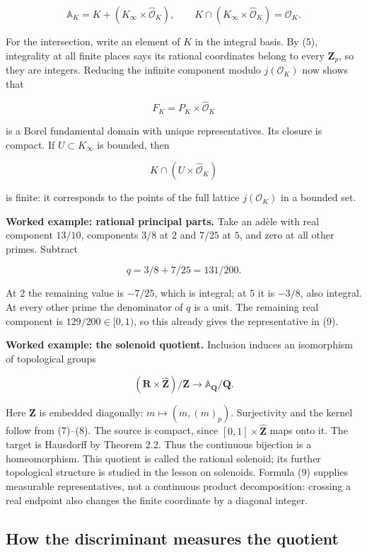 \documentclass[
  english,
  11pt,
  a4paper,
]{article}
\begin{document}
\[\mathbb A_K=K+(K_\infty\times\widehat{\mathcal O}_K),
\qquad
K\cap(K_\infty\times\widehat{\mathcal O}_K)=\mathcal O_K.
\tag{10}\]

For the intersection, write an element of \(K\) in the integral basis.
By (5), integrality at all finite places says its rational coordinates
belong to every \(\mathbf Z_p\), so they are integers. Reducing the
infinite component modulo \(j(\mathcal O_K)\) now shows that

\[F_K=P_K\times\widehat{\mathcal O}_K
\tag{11}\]

is a Borel fundamental domain with unique representatives. Its closure
is compact. If \(U\subset K_\infty\) is bounded, then

\[K\cap(U\times\widehat{\mathcal O}_K)\]

is finite: it corresponds to the points of the full lattice
\(j(\mathcal O_K)\) in a bounded set.

\textbf{Worked example: rational principal parts.} Take an adèle with
real component \(13/10\), components \(3/8\) at \(2\) and \(7/25\) at
\(5\), and zero at all other primes. Subtract

\[q=3/8+7/25=131/200.\]

At \(2\) the remaining value is \(-7/25\), which is integral; at \(5\)
it is \(-3/8\), also integral. At every other prime the denominator of
\(q\) is a unit. The remaining real component is \(129/200\in[0,1)\), so
this already gives the representative in (9).

\textbf{Worked example: the solenoid quotient.} Inclusion induces an
isomorphism of topological groups

\[(\mathbf R\times\widehat{\mathbf Z})/\mathbf Z
\longrightarrow\mathbb A_{\mathbf Q}/\mathbf Q.
\tag{12}\]

Here \(\mathbf Z\) is embedded diagonally: \(m\mapsto(m,(m)_p)\).
Surjectivity and the kernel follow from (7)--(8). The source is compact,
since \([0,1]\times\widehat{\mathbf Z}\) maps onto it. The target is
Hausdorff by Theorem 2.2. Thus the continuous bijection is a
homeomorphism. This quotient is called the rational solenoid; its
further topological structure is studied in the lesson on solenoids.
Formula (9) supplies measurable representatives, not a continuous
product decomposition: crossing a real endpoint also changes the finite
coordinate by a diagonal integer.

\subsection{How the discriminant measures the
quotient}\label{NT-ADL-02--how-the-discriminant-measures-the-quotient}
\end{document}
